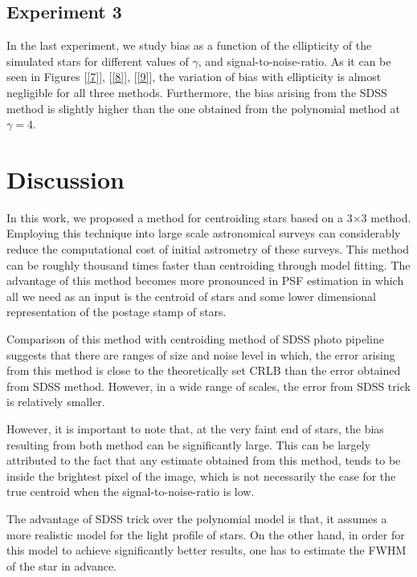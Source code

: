 \documentclass[12pt, preprint]{aastex}
\begin{document}
\subsection{Experiment 3}

In the last experiment, we study bias as a function of the ellipticity of the simulated stars for different values of $\gamma$, and signal-to-noise-ratio. As it can be seen in Figures [\ref{7}], [\ref{8}], [\ref{9}], the variation of bias with ellipticity is almost negligible for all three methods. Furthermore, the bias arising from the SDSS method is slightly higher than the one obtained from the polynomial method at $\gamma = 4$. 

\section{Discussion}\label{sec:discussion}

In this work, we proposed a method for centroiding stars based on a 3$\times$3 method. Employing this technique into large scale astronomical surveys can considerably reduce the computational cost of initial astrometry of these surveys. This method can be roughly thousand times faster than centroiding through model fitting. The advantage of this method becomes more pronounced in PSF estimation in which all we need as an input is the centroid of stars and some lower dimensional representation of the postage stamp of stars. 

Comparison of this method with centroiding method of SDSS photo pipeline suggests that there are ranges of size and noise level in which, the error arising from this method is close to the theoretically set CRLB than the error obtained from SDSS method. However, in a wide range of scales, the error from SDSS trick is relatively smaller.

However, it is important to note that, at the very faint end of stars, the bias resulting from both method can be significantly large. This can be largely attributed to the fact that any estimate obtained from this method, tends to be inside the brightest pixel of the image, which is not necessarily the case for the true centroid when the signal-to-noise-ratio is low. 

The advantage of SDSS trick over the polynomial model is that, it assumes a more realistic model for the light profile of stars. On the other hand, in order for this model to achieve significantly better results, one has to estimate the FWHM of the star in advance.
\end{document}
